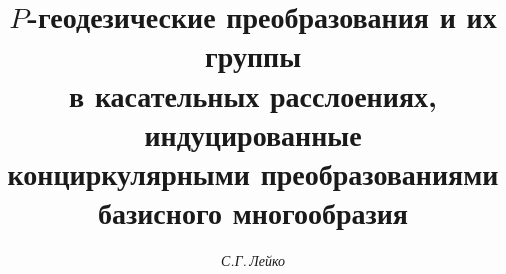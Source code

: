 













\newcommand{\const}{\operatorname{const}}


\newcommand{\tts}[1]{}


\renewcommand{\baselinestretch}{1.05}










\setcounter{page}{35}












\author{\it С.Г.\,Лейко}




\title{$P$-геодезические преобразования и их группы\\


в касательных расслоениях, индуцированные \\


конциркулярными преобразованиями базисного многообразия}





\date{}







